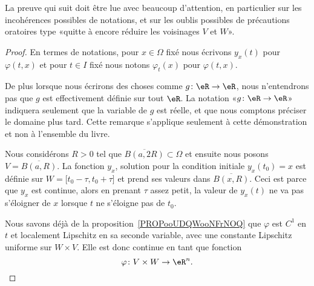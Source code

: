 \begin{probleme}
	La preuve qui suit doit être lue avec beaucoup d'attention, en particulier sur les incohérences possibles de notations, et sur les oublis possibles de précautions oratoires type «quitte à encore réduire les voisinages \( V\) et \( W\)».
\end{probleme}

\begin{proof}
	En termes de notations, pour \( x\in \Omega \) fixé nous écrivons \( y_x(t)\) pour \( \varphi(t,x)\) et pour \( t\in I\) fixé nous notons \( \varphi_t(x)\) pour \( \varphi(t,x)\).

	De plus lorsque nous écrirons des choses comme \( g\colon \eR\to \eR\), nous n'entendrons pas que \( g\) est effectivement définie sur tout \( \eR\). La notation «\( g\colon \eR\to \eR\)» indiquera seulement que la variable de \( g\) est réelle, et que nous comptons préciser le domaine plus tard. Cette remarque s'applique seulement à cette démonstration et non à l'ensemble du livre.

	Nous considérons \( R>0\) tel que \( \overline{ B(a,2R) }\subset\Omega\) et ensuite nous posons \( V=\overline{ B(a,R) }\). La fonction \( y_x\), solution pour la condition initiale \( y_x(t_0)=x\) est définie sur \( W=\mathopen[ t_0-\tau , t_0+\tau  \mathclose]\) et prend ses valeurs dans \( \overline{ B(x,R) }\). Ceci est parce que \( y_x\) est continue, alors en prenant \( \tau\) assez petit, la valeur de \( y_x(t)\) ne va pas s'éloigner de \( x\) lorsque \( t\) ne s'éloigne pas de \( t_0\).

	Nous savons déjà de la proposition~\ref{PROPooUDQWooNFrNOQ} que \( \varphi\) est \( C^1\) en \( t\) et localement Lipschitz en sa seconde variable, avec une constante Lipschitz uniforme sur \( W\times V\). Elle est donc continue en tant que fonction
	\begin{equation}
		\varphi\colon V\times W\to \eR^n.
	\end{equation}


\end{proof}
